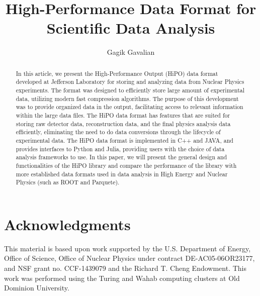 \documentclass[preprint,12pt]{elsarticle}
\title{High-Performance Data Format for Scientific Data Analysis}
\author[1]{Gagik Gavalian}
\begin{document}
\begin{abstract}
In this article, we present the High-Performance Output (HiPO) data format developed at Jefferson Laboratory for 
storing and analyzing data from Nuclear Physics experiments. The format was designed to efficiently store large
amount of experimental data, utilizing modern fast compression algorithms. The purpose of this development was 
to provide organized data in the output, facilitating access to relevant information within the large data files. The HiPO
data format has features that are suited for storing raw detector data, reconstruction data, and the final physics analysis 
data efficiently, eliminating the need to do data conversions through the lifecycle of experimental data. The HiPO data format
is implemented in C++ and JAVA, and provides interfaces to Python and Julia, providing users with the choice of data 
analysis frameworks to use.
In this paper, we will present the general design and functionalities of the HiPO library and compare the performance of the library with
 more established data formats used in data analysis in High Energy and Nuclear Physics (such as ROOT and Parquete).

\end{abstract}
\maketitle







\newpage

\section{Acknowledgments}

This material is based upon work supported by the U.S. Department of Energy, Office of Science,
Office of Nuclear Physics under contract DE-AC05-06OR23177, and NSF grant no. CCF-1439079 and
the Richard T. Cheng Endowment. This work was performed using the Turing and Wahab computing
clusters at Old Dominion University.
 
\newpage


\end{document}
